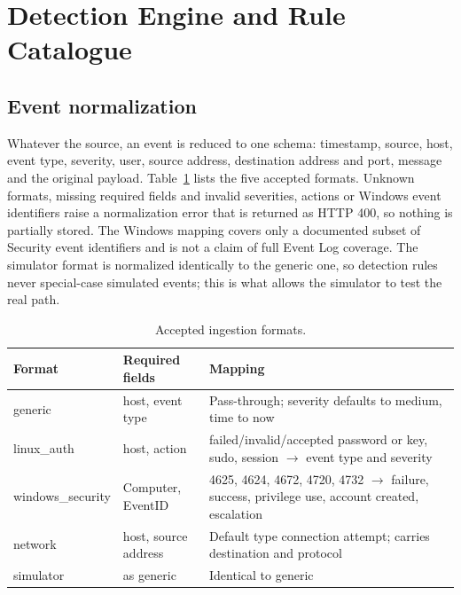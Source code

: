 \documentclass[conference]{IEEEtran}
\begin{document}
\section{Detection Engine and Rule Catalogue}
\subsection{Event normalization}
Whatever the source, an event is reduced to one schema: timestamp, source, host, event type, severity, user, source address, destination address and port, message and the original payload. Table~\ref{tab:formats} lists the five accepted formats. Unknown formats, missing required fields and invalid severities, actions or Windows event identifiers raise a normalization error that is returned as HTTP 400, so nothing is partially stored. The Windows mapping covers only a documented subset of Security event identifiers and is not a claim of full Event Log coverage. The simulator format is normalized identically to the generic one, so detection rules never special-case simulated events; this is what allows the simulator to test the real path.

\begin{table}[t]
\caption{Accepted ingestion formats.}
\label{tab:formats}
\centering
\footnotesize
\setlength{\tabcolsep}{3pt}
\begin{tabular}{@{}l p{1.8cm} p{3.6cm}@{}}
\toprule
Format & Required fields & Mapping \\
\midrule
generic & host, event type & Pass-through; severity defaults to medium, time to now \\
linux\_auth & host, action & failed/invalid/accepted password or key, sudo, session $\to$ event type and severity \\
windows\_security & Computer, EventID & 4625, 4624, 4672, 4720, 4732 $\to$ failure, success, privilege use, account created, escalation \\
network & host, source address & Default type connection attempt; carries destination and protocol \\
simulator & as generic & Identical to generic \\
\bottomrule
\end{tabular}
\end{table}
\end{document}
